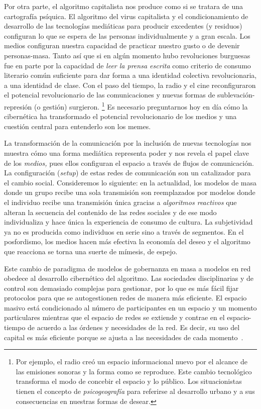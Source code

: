 Por otra parte, el algoritmo capitalista nos produce como si se tratara de una cartografía psíquica. El algoritmo del virus capitalista y el condicionamiento de desarrollo de las tecnologías mediáticas para producir excedentes (y residuos) configuran lo que se espera de las personas individualmente y a gran escala. Los medios configuran nuestra capacidad de practicar nuestro gusto o de devenir personas-masa. Tanto así que si en algún momento hubo revoluciones burguesas fue en parte por la capacidad de \emph{leer la prensa escrita} como criterio de consumo literario común suficiente para dar forma a una identidad colectiva revolucionaria, a una identidad de clase. Con el paso del tiempo, la radio y el cine reconfiguraron el potencial revolucionario de las comunicaciones y nuevas formas de sublevación-represión (o gestión) surgieron. \footnote{Por ejemplo, el radio creó un espacio informacional nuevo por el alcance de las emisiones sonoras y la forma como se reproduce. Este cambio tecnológico transforma el modo de concebir el espacio y lo público. Los situacionistas tienen el concepto de \emph{psicogeografía} para referirse al desarrollo urbano y a sus consecuencias en nuestras formas de desear.} Es necesario preguntarnos hoy en día cómo la cibernética ha transformado el potencial revolucionario de los medios y una cuestión central para entenderlo son los memes.

La transformación de la comunicación por la inclusión de nuevas tecnologías nos muestra cómo una forma mediática representa poder y nos revela el papel clave de los \emph{medios,} pues ellos configuran el espacio a través de flujos de comunicación. La configuración (\emph{setup}) de estas redes de comunicación son un catalizador para el cambio social. Consideremos lo siguiente: en la actualidad, los modelos de masa donde un grupo recibe una sola transmisión son reemplazados por modelos donde el individuo recibe una transmisión única gracias a \emph{algoritmos reactivos} que alteran la secuencia del contenido de las redes sociales y de ese modo individualiza y hace única la experiencia de consumo de cultura. La subjetividad ya no es producida como individuos en serie sino a través de segmentos. En el posfordismo, los medios hacen más efectiva la economía del deseo y el algoritmo que reacciona se torna una suerte de mímesis, de espejo.

Este cambio de paradigma de modelos de gobernanza en masa a modelos en red obedece al desarrollo cibernético del algoritmo. Las sociedades disciplinarias y de control son demasiado complejas para gestionar, por lo que es más fácil fijar protocolos para que se autogestionen redes de manera más eficiente. El espacio masivo está condicionado al número de participantes en un espacio y un momento particulares mientras que el espacio de redes se extiende y contrae en el espacio-tiempo de acuerdo a las órdenes y necesidades de la red. Es decir, su uso del capital es más eficiente porque se ajusta a las necesidades de cada momento~\autocite{PeopleArePeople2018}.

